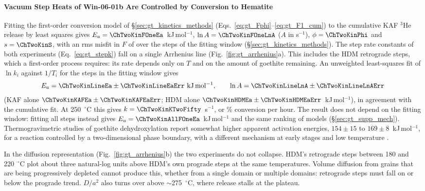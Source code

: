 \paragraph{Vacuum Step Heats of Win-06-01b Are Controlled by Conversion to Hematite}\label{sec:gt_vacuum}

Fitting the first-order conversion model of \S\ref{sec:gt_kinetics_methods}
(Eqs.~\eqref{eq:gt_Fphi}--\eqref{eq:gt_F1_cum}) to the cumulative KAF $^3$He
release by least squares gives $E_a = \ChTwoKinFOneEa$~kJ\,mol$^{-1}$, $\ln A = \ChTwoKinFOneLnA$ ($A$ in s$^{-1}$),
$\phi = \ChTwoKinPhi$ and $s = \ChTwoKinS$, with an rms misfit in $F$ of \ChTwoKinFOneRmsKAF{} over the
\ChTwoKinNKAF{} steps of the fitting window (\S\ref{sec:gt_kinetics_methods}). The step rate constants of
both experiments (Eq.~\eqref{eq:gt_stepk}) fall on a single Arrhenius line
(Fig.~\ref{fig:gt_arrhenius}a). This includes the HDM retrograde steps, which a first-order
process requires: its rate depends only on $T$ and on the amount of goethite remaining. An
unweighted least-squares fit of $\ln k_i$ against $1/T_i$ for the \ChTwoKinLineN{} steps in the fitting window
gives
\begin{equation}
  E_a = \ChTwoKinLineEa \pm \ChTwoKinLineEaErr~\mathrm{kJ\,mol^{-1}},
  \qquad
  \ln A = \ChTwoKinLineLnA \pm \ChTwoKinLineLnAErr
  \label{eq:gt_line}
\end{equation}
(KAF alone $\ChTwoKinKAFEa\pm\ChTwoKinKAFEaErr$; HDM alone $\ChTwoKinHDMEa\pm\ChTwoKinHDMEaErr$~kJ\,mol$^{-1}$), in agreement with the
cumulative fit. At 250~$^\circ$C this gives $k = \ChTwoKinKTwoFifty$~s$^{-1}$, or \ChTwoKinConvPerHour\% conversion
per hour. The result does not depend on the fitting window: fitting all steps instead gives
$E_a = \ChTwoKinAllFOneEa$~kJ\,mol$^{-1}$ and the same ranking of models (\S\ref{sec:gt_supp_mech}).
Thermogravimetric studies of goethite dehydroxylation report somewhat higher apparent activation
energies, $154\pm15$ to $169\pm8$~kJ\,mol$^{-1}$, for a reaction controlled by a two-dimensional
phase boundary, with a different mechanism at early stages and low temperature \citep{goss1987}.

In the diffusion representation (Fig.~\ref{fig:gt_arrhenius}b) the two experiments do not
collapse. HDM's retrograde steps between 180 and 220~$^\circ$C plot about three natural-log units
above HDM's own prograde steps at the same temperatures. Volume diffusion from grains that are
being progressively depleted cannot produce this, whether from a single domain or multiple
domains: retrograde steps must fall on or below the prograde trend. $D/a^2$ also turns over
above $\sim$275~$^\circ$C, where release stalls at the plateau.

